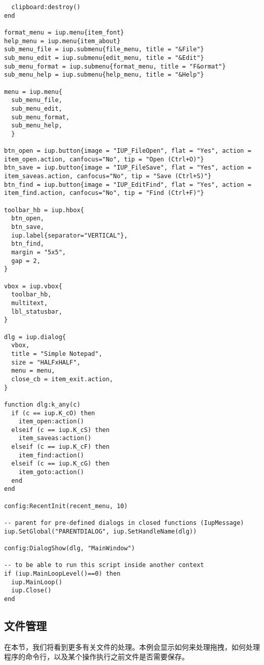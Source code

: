 \documentclass{ctexart}
\begin{document}
\begin{lstlisting}
  clipboard:destroy()
end

format_menu = iup.menu{item_font}
help_menu = iup.menu{item_about}
sub_menu_file = iup.submenu{file_menu, title = "&File"}
sub_menu_edit = iup.submenu{edit_menu, title = "&Edit"}
sub_menu_format = iup.submenu{format_menu, title = "F&ormat"}
sub_menu_help = iup.submenu{help_menu, title = "&Help"}

menu = iup.menu{
  sub_menu_file, 
  sub_menu_edit, 
  sub_menu_format, 
  sub_menu_help,
  }

btn_open = iup.button{image = "IUP_FileOpen", flat = "Yes", action = item_open.action, canfocus="No", tip = "Open (Ctrl+O)"}
btn_save = iup.button{image = "IUP_FileSave", flat = "Yes", action = item_saveas.action, canfocus="No", tip = "Save (Ctrl+S)"}
btn_find = iup.button{image = "IUP_EditFind", flat = "Yes", action = item_find.action, canfocus="No", tip = "Find (Ctrl+F)"}

toolbar_hb = iup.hbox{
  btn_open,
  btn_save,
  iup.label{separator="VERTICAL"},
  btn_find, 
  margin = "5x5",
  gap = 2,
}

vbox = iup.vbox{
  toolbar_hb,
  multitext,
  lbl_statusbar,
}

dlg = iup.dialog{
  vbox,
  title = "Simple Notepad",
  size = "HALFxHALF",
  menu = menu,
  close_cb = item_exit.action,
}

function dlg:k_any(c)
  if (c == iup.K_cO) then
    item_open:action()
  elseif (c == iup.K_cS) then
    item_saveas:action()
  elseif (c == iup.K_cF) then
    item_find:action()
  elseif (c == iup.K_cG) then
    item_goto:action()
  end
end

config:RecentInit(recent_menu, 10)

-- parent for pre-defined dialogs in closed functions (IupMessage)
iup.SetGlobal("PARENTDIALOG", iup.SetHandleName(dlg))

config:DialogShow(dlg, "MainWindow")

-- to be able to run this script inside another context
if (iup.MainLoopLevel()==0) then
  iup.MainLoop()
  iup.Close()
end
\end{lstlisting}

\subsection{文件管理}

在本节，我们将看到更多有关文件的处理。本例会显示如何来处理拖拽，如何处理
程序的命令行，以及某个操作执行之前文件是否需要保存。
\end{document}
